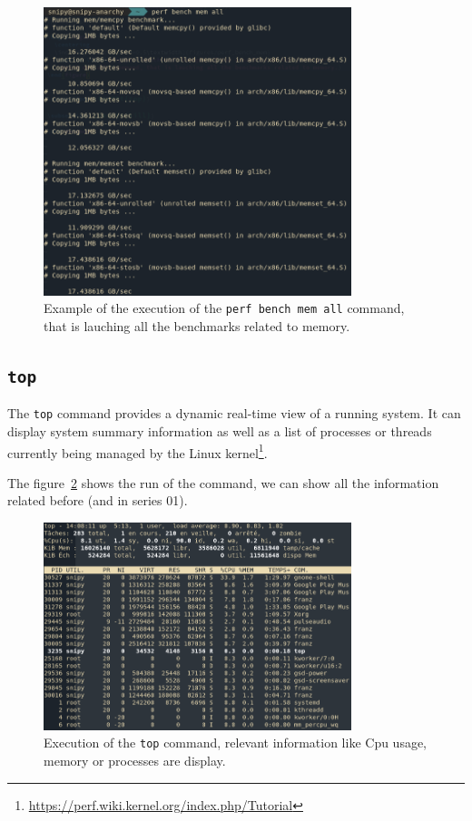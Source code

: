 \documentclass[a4paper,11pt]{report}
\begin{document}
\begin{figure}[ht]
  \centering
  \includegraphics[width=0.8\textwidth]{figures/perf_bench_mem}
  \caption{\label{fig:perf-bench-mem} Example of the execution of the \texttt{perf
    bench mem all} command, that is lauching all the benchmarks related to memory.}
\end{figure}

\subsection*{\texttt{top}}

The \verb+top+ command provides a dynamic real-time view of a running
system. It can display system summary information as well as a
list of processes or threads currently being managed by the Linux
kernel\footnote{\url{https://perf.wiki.kernel.org/index.php/Tutorial}}.

The figure~\ref{fig:top} shows the run of the command, we can show all the
information related before (and in series 01).

\begin{figure}[ht]
  \centering
  \includegraphics[width=0.8\textwidth]{figures/top}
  \caption{\label{fig:top} Execution of the \texttt{top} command, relevant
    information like Cpu usage, memory or processes are display.}
\end{figure}
\end{document}
